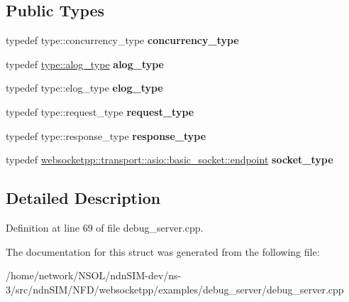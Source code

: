 \subsection*{Public Types}
\begin{DoxyCompactItemize}
\item 
typedef type\+::concurrency\+\_\+type {\bfseries concurrency\+\_\+type}\hypertarget{structdebug__custom_1_1transport__config_ad971252f0797121281a99e7ef967ca94}{}\label{structdebug__custom_1_1transport__config_ad971252f0797121281a99e7ef967ca94}

\item 
typedef \hyperlink{structdebug__custom_a30b665e32e61e9ded636e08b937786c3}{type\+::alog\+\_\+type} {\bfseries alog\+\_\+type}\hypertarget{structdebug__custom_1_1transport__config_abb0764724581e00895e61dd0cead3dbd}{}\label{structdebug__custom_1_1transport__config_abb0764724581e00895e61dd0cead3dbd}

\item 
typedef type\+::elog\+\_\+type {\bfseries elog\+\_\+type}\hypertarget{structdebug__custom_1_1transport__config_a97bef77a8d5452331485f3b964230aec}{}\label{structdebug__custom_1_1transport__config_a97bef77a8d5452331485f3b964230aec}

\item 
typedef type\+::request\+\_\+type {\bfseries request\+\_\+type}\hypertarget{structdebug__custom_1_1transport__config_af3bf13e3199147e00efd76baf99d5e82}{}\label{structdebug__custom_1_1transport__config_af3bf13e3199147e00efd76baf99d5e82}

\item 
typedef type\+::response\+\_\+type {\bfseries response\+\_\+type}\hypertarget{structdebug__custom_1_1transport__config_ab9d4a0184fb6372f6e90b8f15fb38301}{}\label{structdebug__custom_1_1transport__config_ab9d4a0184fb6372f6e90b8f15fb38301}

\item 
typedef \hyperlink{classwebsocketpp_1_1transport_1_1asio_1_1basic__socket_1_1endpoint}{websocketpp\+::transport\+::asio\+::basic\+\_\+socket\+::endpoint} {\bfseries socket\+\_\+type}\hypertarget{structdebug__custom_1_1transport__config_a3966c723f72f598f05abf959ed81e767}{}\label{structdebug__custom_1_1transport__config_a3966c723f72f598f05abf959ed81e767}

\end{DoxyCompactItemize}


\subsection{Detailed Description}


Definition at line 69 of file debug\+\_\+server.\+cpp.



The documentation for this struct was generated from the following file\+:\begin{DoxyCompactItemize}
\item 
/home/network/\+N\+S\+O\+L/ndn\+S\+I\+M-\/dev/ns-\/3/src/ndn\+S\+I\+M/\+N\+F\+D/websocketpp/examples/debug\+\_\+server/debug\+\_\+server.\+cpp\end{DoxyCompactItemize}
